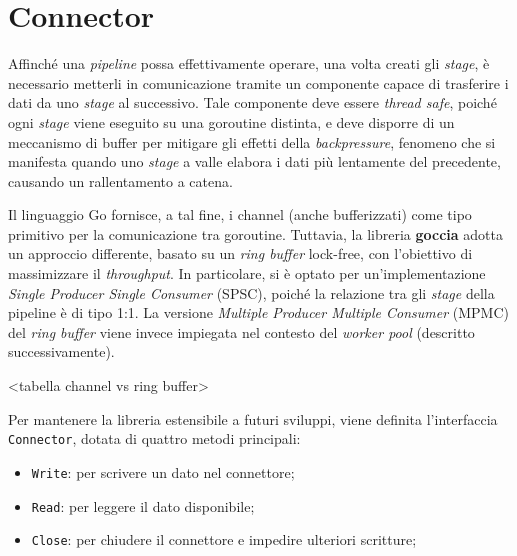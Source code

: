 \section{Connector}

Affinché una \textit{pipeline} possa effettivamente operare, una volta creati gli \textit{stage}, è necessario metterli in comunicazione tramite un componente capace di trasferire i dati da uno \textit{stage} al successivo. Tale componente deve essere \textit{thread safe}, poiché ogni \textit{stage} viene eseguito su una goroutine distinta, e deve disporre di un meccanismo di buffer per mitigare gli effetti della \textit{backpressure}, fenomeno che si manifesta quando uno \textit{stage} a valle elabora i dati più lentamente del precedente, causando un rallentamento a catena.

Il linguaggio Go fornisce, a tal fine, i channel (anche bufferizzati) come tipo primitivo per la comunicazione tra goroutine. Tuttavia, la libreria \textbf{goccia} adotta un approccio differente, basato su un \textit{ring buffer} lock-free, con l’obiettivo di massimizzare il \textit{throughput}. In particolare, si è optato per un’implementazione \textit{Single Producer Single Consumer} (SPSC), poiché la relazione tra gli \textit{stage} della pipeline è di tipo 1:1. La versione \textit{Multiple Producer Multiple Consumer} (MPMC) del \textit{ring buffer} viene invece impiegata nel contesto del \textit{worker pool} (descritto successivamente).

<tabella channel vs ring buffer>

Per mantenere la libreria estensibile a futuri sviluppi, viene definita l’interfaccia \texttt{Connector}, dotata di quattro metodi principali:
\begin{itemize}
    \item \texttt{Write}: per scrivere un dato nel connettore;
    \item \texttt{Read}: per leggere il dato disponibile;
    \item \texttt{Close}: per chiudere il connettore e impedire ulteriori scritture;
\end{itemize}